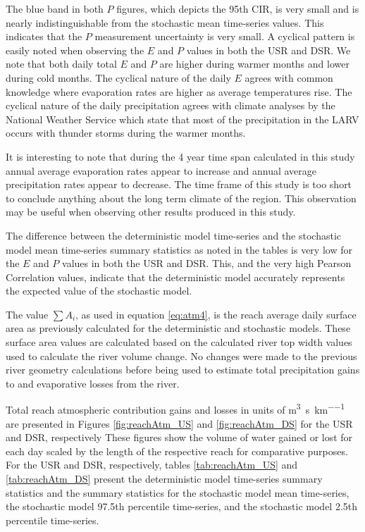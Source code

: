 The blue band in both $ P $ figures, which depicts the 95th CIR, is very small and is nearly indistinguishable from the stochastic mean time-series values.  This indicates that the $ P $ measurement uncertainty is very small.  A cyclical pattern is easily noted when observing the $ E $ and $ P $ values in both the USR and DSR.  We note that both daily total $ E $ and $ P $ are higher during warmer months and lower during cold months.  The cyclical nature of the daily $ E $ agrees with common knowledge where evaporation rates are higher as average temperatures rise.  The cyclical nature of the daily precipitation agrees with climate analyses by the National Weather Service which state that most of the precipitation in the LARV occurs with thunder storms during the warmer months.

It is interesting to note that during the 4 year time span calculated in this study annual average evaporation rates appear to increase and annual average precipitation rates appear to decrease.  The time frame of this study is too short to conclude anything about the long term climate of the region.  This observation may be useful when observing other results produced in this study.

The difference between the deterministic model time-series and the stochastic model mean time-series summary statistics as noted in the tables is very low for the $ E $ and $ P $ values in both the USR and DSR.  This, and the very high Pearson Correlation values, indicate that the deterministic model accurately represents the expected value of the stochastic model.

The value $ \displaystyle \sum A_i  $, as used in equation \ref{eq:atm4}, is the reach average daily surface area as previously calculated for the deterministic and stochastic models.  These surface area values are calculated based on the calculated river top width values used to calculate the river volume change.  No changes were made to the previous river geometry calculations before being used to estimate total precipitation gains to and evaporative losses from the river.

Total reach atmospheric contribution gains and losses in units of \si{\cubic\meter\per\second\per\kilo\meter} are presented in Figures \ref{fig:reachAtm_US} and \ref{fig:reachAtm_DS} for the USR and DSR, respectively  These figures show the volume of water gained or lost for each day scaled by the length of the respective reach for comparative purposes.  For the USR and DSR, respectively, tables \ref{tab:reachAtm_US} and \ref{tab:reachAtm_DS} present the deterministic model time-series summary statistics and the summary statistics for the stochastic model mean time-series, the stochastic model 97.5th percentile time-series, and the stochastic model 2.5th percentile time-series.


